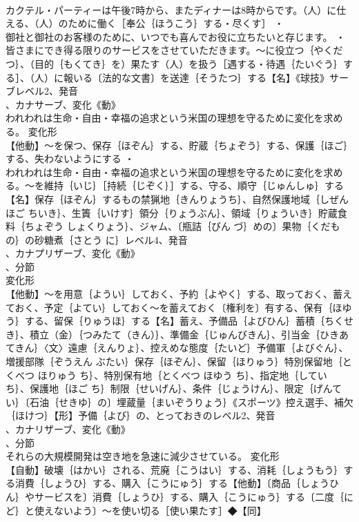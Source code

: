 \documentclass[8pt]{extreport}
\begin{document}
\begin{CJK}{UTF8}{min}
\\	カクテル・パーティーは午後7時から、またディナーは8時からです。（人）に仕える、（人）のために働く［奉公｛ほうこう｝する・尽くす］ ・
\\	御社と御社のお客様のために、いつでも喜んでお役に立ちたいと存じます。 ・
\\	皆さまにでき得る限りのサービスをさせていただきます。～に役立つ｛やくだつ｝、（目的｛もくてき｝を）果たす（人）を扱う［遇する・待遇｛たいぐう｝する］、（人）に報いる〔法的な文書〕を送達｛そうたつ｝する【名】《球技》サーブレベル2、発音
\\	、カナサーブ、変化《動》
\\	われわれは生命・自由・幸福の追求という米国の理想を守るために変化を求める。	変化形 
\\	【他動】～を保つ、保存｛ほぞん｝する、貯蔵｛ちょぞう｝する、保護｛ほご｝する、失わないようにする ・
\\	われわれは生命・自由・幸福の追求という米国の理想を守るために変化を求める。～を維持｛いじ｝［持続｛じぞく｝］する、守る、順守｛じゅんしゅ｝する【名】保存｛ほぞん｝するもの禁猟地｛きんりょうち｝、自然保護地域｛しぜん ほご ちいき｝、生簀｛いけす｝領分｛りょうぶん｝、領域｛りょういき｝貯蔵食料｛ちょぞう しょくりょう｝、ジャム、〔瓶詰｛びん づ｝めの〕果物｛くだもの｝の砂糖煮｛さとう に｝レベル4、発音
\\	、カナプリザーブ、変化《動》
\\	、分節
\\	変化形 
\\	【他動】～を用意｛ようい｝しておく、予約｛よやく｝する、取っておく、蓄えておく、予定｛よてい｝しておく～を蓄えておく〔権利を〕有する、保有｛ほゆう｝する、留保｛りゅうほ｝する【名】蓄え、予備品｛よびひん｝蓄積｛ちくせき｝、積立（金）｛つみたて（きん）｝、準備金｛じゅんびきん｝、引当金｛ひきあてきん｝〈文〉遠慮｛えんりょ｝、控えめな態度｛たいど｝予備軍｛よびぐん｝、増援部隊｛ぞうえん ぶたい｝保存｛ほぞん｝、保留｛ほりゅう｝特別保留地｛とくべつ ほりゅう ち｝、特別保有地｛とくべつ ほゆう ち｝、指定地｛してい ち｝、保護地｛ほご ち｝制限｛せいげん｝、条件｛じょうけん｝、限定｛げんてい｝〔石油｛せきゆ｝の〕埋蔵量｛まいぞうりょう｝《スポーツ》控え選手、補欠｛ほけつ｝【形】予備｛よび｝の、とっておきのレベル2、発音
\\	、カナリザーブ、変化《動》
\\	、分節
\\	それらの大規模開発は空き地を急速に減少させている。	変化形 
\\	【自動】破壊｛はかい｝される、荒廃｛こうはい｝する、消耗｛しょうもう｝する消費｛しょうひ｝する、購入｛こうにゅう｝する【他動】〔商品｛しょうひん｝やサービスを〕消費｛しょうひ｝する、購入｛こうにゅう｝する〔二度｛にど｝と使えないよう〕～を使い切る［使い果たす］◆【同】

\end{CJK}
\end{document}
